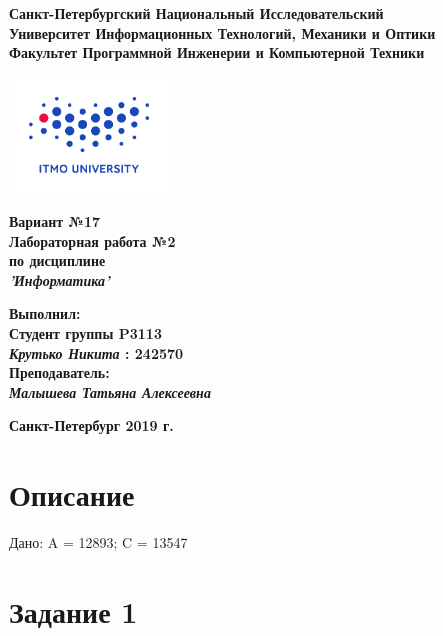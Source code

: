 \documentclass[11pt]{article}
\author{Крутько Никита}
\date{\today}
\title{}
\begin{document}
\begin{center}
\textbf{Санкт-Петербургский Национальный Исследовательский}\\
\textbf{Университет Информационных Технологий, Механики и Оптики}\\
\textbf{Факультет Программной Инженерии и Компьютерной Техники}\\
\end{center}
\vspace{1em}
\begin{center}
\includegraphics[width=120pt]{../itmo-logo.png}
\end{center}
\LARGE
\vspace{5em}
\begin{center}
\textbf{Вариант №17}\\
\textbf{Лабораторная работа №2}\\
\Large
\textbf{по дисциплине}\\
\LARGE
\textbf{\emph{'Информатика'}}\\
\end{center}
\vspace{11em}
\large
\begin{flushright}
\textbf{Выполнил:}\\
\textbf{Студент группы P3113}\\
\textbf{\emph{Крутько Никита} : 242570}\\
\textbf{Преподаватель:}\\
\textbf{\emph{Малышева Татьяна Алексеевна}}\\
\end{flushright}
\vspace{4em}
\large
\begin{center}
\textbf{Санкт-Петербург 2019 г.}
\end{center}
\pagebreak{}
\setcounter{tocdepth}{2}
\tableofcontents
\vspace{2em}
\section{Описание}
\label{sec:org76da9de}
Дано: A = 12893; C = 13547
\section{Задание 1}
\label{sec:org33ca740}
\end{document}
